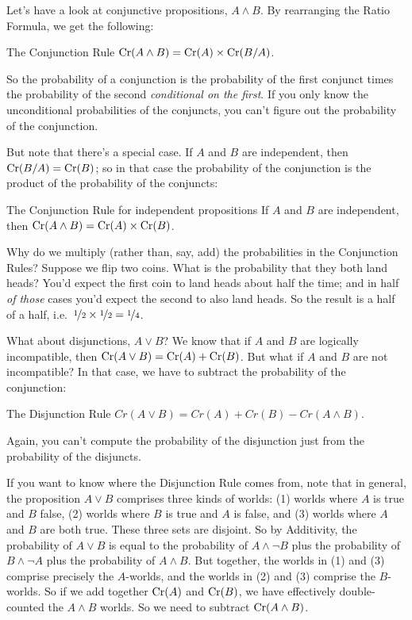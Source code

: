 Let's have a look at conjunctive propositions, $A \land B$. By
rearranging the Ratio Formula, we get the following:
%
\begin{genericthm}{The Conjunction Rule}
  $\text{Cr}(A \land B) = \text{Cr}(A) \times \text{Cr}(B / A)$.
\end{genericthm}
%
So the probability of a conjunction is the probability of the first
conjunct times the probability of the second \emph{conditional on the
  first}. If you only know the unconditional probabilities of the
conjuncts, you can't figure out the probability of the conjunction.

But note that there's a special case. If $A$ and $B$ are independent,
then $\text{Cr}(B/A) = \text{Cr}(B)$; so in that case the probability of the
conjunction is the product of the probability of the conjuncts:
%
\begin{genericthm}{The Conjunction Rule for independent propositions}
  If $A$ and $B$ are independent, then $\text{Cr}(A \land B) = \text{Cr}(A) \times
  \text{Cr}(B)$.
\end{genericthm}

Why do we multiply (rather than, say, add) the probabilities in the
Conjunction Rules? Suppose we flip two coins. What is the probability
that they both land heads? You'd expect the first coin to land heads
about half the time; and in half \emph{of those} cases you'd expect
the second to also land heads. So the result is a half of a half,
i.e.\ $\nicefrac{1}{2} \times \nicefrac{1}{2} = \nicefrac{1}{4}$.

What about disjunctions, $A \lor B$? We know that if $A$ and $B$ are
logically incompatible, then $\text{Cr}(A \lor B) = \text{Cr}(A) + \text{Cr}(B)$. But
what if $A$ and $B$ are not incompatible? In that case, we have to
subtract the probability of the conjunction:
%
\begin{genericthm}{The Disjunction Rule}
  $Cr(A \lor B) = Cr(A) + Cr(B) - Cr(A\land B)$.
\end{genericthm}
%
Again, you can't compute the probability of the disjunction just from
the probability of the disjuncts.

If you want to know where the Disjunction Rule comes from, note that
in general, the proposition $A\lor B$ comprises three kinds of worlds:
(1) worlds where $A$ is true and $B$ false, (2) worlds where $B$ is
true and $A$ is false, and (3) worlds where $A$ and $B$ are both
true. These three sets are disjoint. So by Additivity, the probability
of $A \lor B$ is equal to the probability of $A \land \neg B$ plus the
probability of $B \land \neg A$ plus the probability of $A \land
B$. But together, the worlds in (1) and (3) comprise precisely the
$A$-worlds, and the worlds in (2) and (3) comprise the $B$-worlds. So
if we add together $\text{Cr}(A)$ and $\text{Cr}(B)$, we have effectively
double-counted the $A \land B$ worlds. So we need to subtract $\text{Cr}(A
\land B)$.

